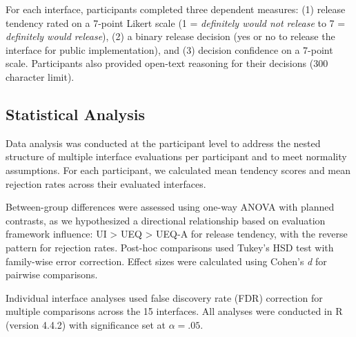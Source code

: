 For each interface, participants completed three dependent measures: (1) release tendency rated on a 7-point Likert scale (1 = \textit{definitely would not release} to 7 = \textit{definitely would release}), (2) a binary release decision (yes or no to release the interface for public implementation), and (3) decision confidence on a 7-point scale. Participants also provided open-text reasoning for their decisions (300 character limit).

\subsection{Statistical Analysis}

Data analysis was conducted at the participant level to address the nested structure of multiple interface evaluations per participant and to meet normality assumptions. For each participant, we calculated mean tendency scores and mean rejection rates across their evaluated interfaces. 

Between-group differences were assessed using one-way ANOVA with planned contrasts, as we hypothesized a directional relationship based on evaluation framework influence: UI > UEQ > UEQ-A for release tendency, with the reverse pattern for rejection rates. Post-hoc comparisons used Tukey's HSD test with family-wise error correction. Effect sizes were calculated using Cohen's \textit{d} for pairwise comparisons.

Individual interface analyses used false discovery rate (FDR) correction for multiple comparisons across the 15 interfaces. All analyses were conducted in R (version 4.4.2) with significance set at $\alpha = .05$.
